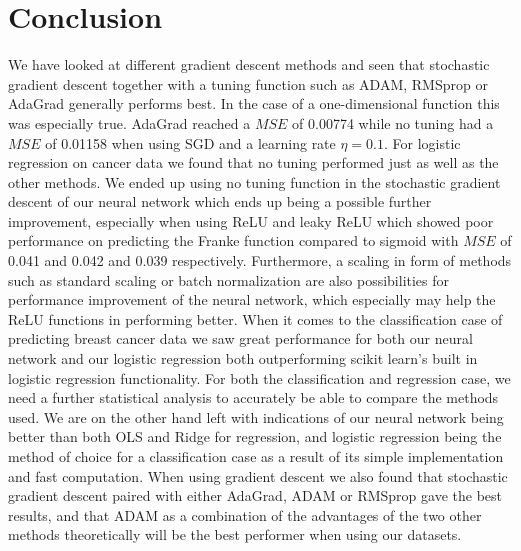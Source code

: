 \documentclass[11pt]{article}
\begin{document}
\section{Conclusion}
We have looked at different gradient descent methods and seen that stochastic gradient descent together with a tuning function such as ADAM, RMSprop or AdaGrad generally performs best. In the case of a one-dimensional function this was especially true. AdaGrad reached a $MSE$ of 0.00774 while no tuning had a $MSE$ of 0.01158 when using SGD and a learning rate $\eta=0.1$. For logistic regression on cancer data we found that no tuning performed just as well as the other methods. We ended up using no tuning function in the stochastic gradient descent of our neural network which ends up being a possible further improvement, especially when using ReLU and leaky ReLU which showed poor performance on predicting the Franke function compared to sigmoid with $MSE$ of 0.041 and 0.042 and 0.039 respectively. Furthermore, a scaling in form of methods such as standard scaling or batch normalization are also possibilities for performance improvement of the neural network, which especially may help the ReLU functions in performing better. When it comes to the classification case of predicting breast cancer data we saw great performance for both our neural network and our logistic regression both outperforming scikit learn's built in logistic regression functionality. For both the classification and regression case, we need a further statistical analysis to accurately be able to compare the methods used. We are on the other hand left with indications of our neural network being better than both OLS and Ridge for regression, and logistic regression being the method of choice for a classification case as a result of its simple implementation and fast computation. When using gradient descent we also found that stochastic gradient descent paired with either AdaGrad, ADAM or RMSprop gave the best results, and that ADAM as a combination of the advantages of the two other methods theoretically will be the best performer when using our datasets.
\nocite{nielsen}
\nocite{Mehta_2019}
\nocite{hastie}
\printbibliography
\end{document}
